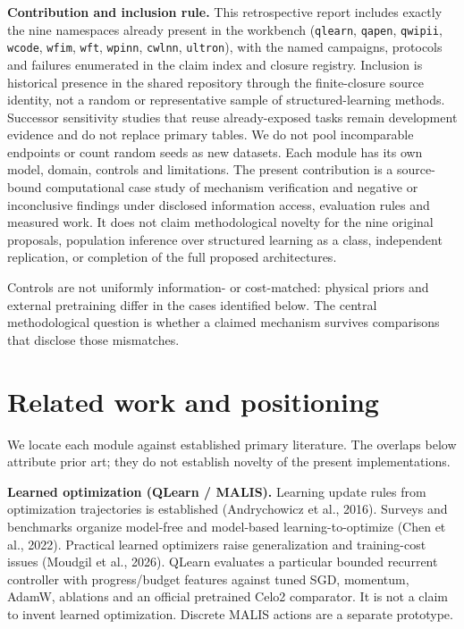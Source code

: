 \documentclass[
  11pt,
  a4paper,
]{article}
\begin{document}
\textbf{Contribution and inclusion rule.} This retrospective report
includes exactly the nine namespaces already present in the workbench
(\texttt{qlearn}, \texttt{qapen}, \texttt{qwipii}, \texttt{wcode},
\texttt{wfim}, \texttt{wft}, \texttt{wpinn}, \texttt{cwlnn},
\texttt{ultron}), with the named campaigns, protocols and failures
enumerated in the claim index and closure registry. Inclusion is
historical presence in the shared repository through the finite-closure
source identity, not a random or representative sample of
structured-learning methods. Successor sensitivity studies that reuse
already-exposed tasks remain development evidence and do not replace
primary tables. We do not pool incomparable endpoints or count random
seeds as new datasets. Each module has its own model, domain, controls
and limitations. The present contribution is a source-bound
computational case study of mechanism verification and negative or
inconclusive findings under disclosed information access, evaluation
rules and measured work. It does not claim methodological novelty for
the nine original proposals, population inference over structured
learning as a class, independent replication, or completion of the full
proposed architectures.

Controls are not uniformly information- or cost-matched: physical priors
and external pretraining differ in the cases identified below. The
central methodological question is whether a claimed mechanism survives
comparisons that disclose those mismatches.

\section{Related work and
positioning}\label{related-work-and-positioning}

We locate each module against established primary literature. The
overlaps below attribute prior art; they do not establish novelty of the
present implementations.

\textbf{Learned optimization (QLearn / MALIS).} Learning update rules
from optimization trajectories is established (Andrychowicz et al.,
2016). Surveys and benchmarks organize model-free and model-based
learning-to-optimize (Chen et al., 2022). Practical learned optimizers
raise generalization and training-cost issues (Moudgil et al., 2026).
QLearn evaluates a particular bounded recurrent controller with
progress/budget features against tuned SGD, momentum, AdamW, ablations
and an official pretrained Celo2 comparator. It is not a claim to invent
learned optimization. Discrete MALIS actions are a separate prototype.
\end{document}
